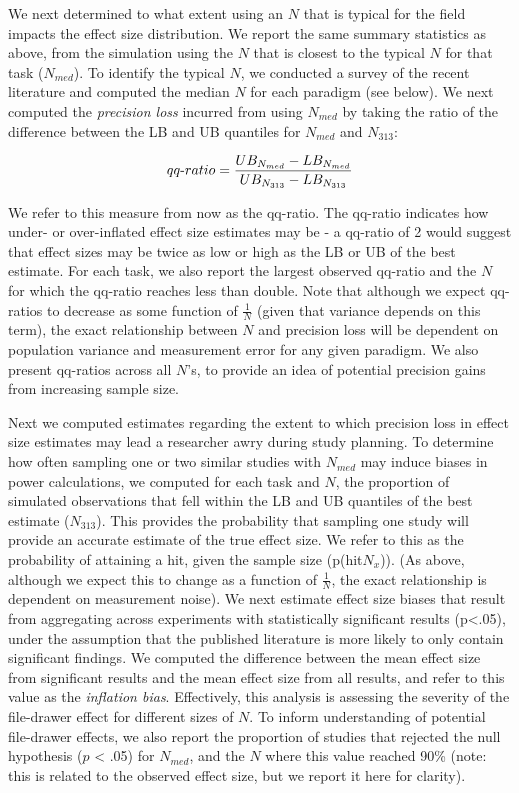 \documentclass[
  man]{apa6}
\begin{document}
We next determined to what extent using an \(N\) that is typical for the field impacts the effect size distribution. We report the same summary statistics as above, from the simulation using the \(N\) that is closest to the typical \(N\) for that task (\(N_{med}\)). To identify the typical \(N\), we conducted a survey of the recent literature and computed the median \(N\) for each paradigm (see below). We next computed the \emph{precision loss} incurred from using \(N_{med}\) by taking the ratio of the difference between the LB and UB quantiles for \(N_{med}\) and \(N_{313}\):

\[
qq{\text -}ratio = \frac{ UB_{N_{med}} - LB_{N_{med}}}{UB_{N_{313}} - LB_{N_{313}}}
\]

We refer to this measure from now as the qq-ratio. The qq-ratio indicates how under- or over-inflated effect size estimates may be - a qq-ratio of 2 would suggest that effect sizes may be twice as low or high as the LB or UB of the best estimate. For each task, we also report the largest observed qq-ratio and the \(N\) for which the qq-ratio reaches less than double. Note that although we expect qq-ratios to decrease as some function of \(\frac{1}{N}\) (given that variance depends on this term), the exact relationship between \(N\) and precision loss will be dependent on population variance and measurement error for any given paradigm. We also present qq-ratios across all \(N\)'s, to provide an idea of potential precision gains from increasing sample size.

Next we computed estimates regarding the extent to which precision loss in effect size estimates may lead a researcher awry during study planning. To determine how often sampling one or two similar studies with \(N_{med}\) may induce biases in power calculations, we computed for each task and \(N\), the proportion of simulated observations that fell within the LB and UB quantiles of the best estimate (\(N_{313}\)). This provides the probability that sampling one study will provide an accurate estimate of the true effect size. We refer to this as the probability of attaining a hit, given the sample size (p(hit\textbar{}\(N_{x}\))). (As above, although we expect this to change as a function of \(\frac{1}{N}\), the exact relationship is dependent on measurement noise). We next estimate effect size biases that result from aggregating across experiments with statistically significant results (p\textless.05), under the assumption that the published literature is more likely to only contain significant findings. We computed the difference between the mean effect size from significant results and the mean effect size from all results, and refer to this value as the \emph{inflation bias}. Effectively, this analysis is assessing the severity of the file-drawer effect for different sizes of \(N\). To inform understanding of potential file-drawer effects, we also report the proportion of studies that rejected the null hypothesis (\(p\) \textless{} .05) for \(N_{med}\), and the \(N\) where this value reached 90\% (note: this is related to the observed effect size, but we report it here for clarity).
\end{document}
